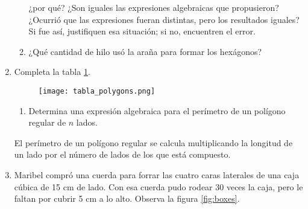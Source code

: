 \begin{enumerate}
\begin{enumerate}
                    ¿por qué? ¿Son iguales las expresiones algebraicas que propusieron? ¿Ocurrió que
                    las expresiones fueran distintas, pero los resultados iguales? Si fue así, justifiquen
                    esa situación; si no, encuentren el error.
              \item ¿Qué cantidad de hilo usó la araña para formar los hexágonos?
          \end{enumerate}
    \item Completa la tabla \ref{tab:tabla_polygons}.
          \begin{figure}[H]
              \centering
              \texttt{[image: tabla\_polygons.png]}
              \label{tab:tabla_polygons}
          \end{figure}
          \begin{enumerate}
              \item Determina una expresión algebraica para el perímetro de un polígono regular de $n$ lados.
          \end{enumerate}

          \begin{boxH}
              El perímetro de un polígono regular se calcula multiplicando la longitud de un
              lado por el número de lados de los que está compuesto.
          \end{boxH}

    \item Maribel compró una cuerda para forrar las cuatro caras laterales de una caja cúbica de 15 cm de lado.
          Con esa cuerda pudo rodear 30 veces la caja, pero le faltan
          por cubrir 5 cm a lo alto. Observa la figura \ref{fig:boxes}.


\end{enumerate}
